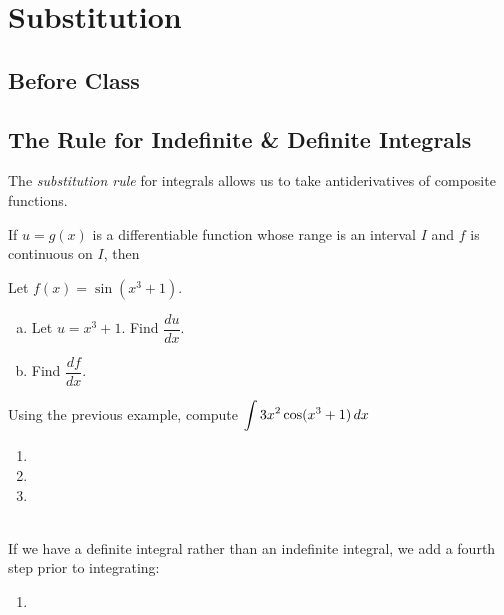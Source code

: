 \documentclass[notes]{subfiles}
\begin{document}
	\setcounter{section}{4}
	\fancyhead[LO,RE]{\bfseries \currentname}
	\fancyfoot[C]{{}}
	\fancyfoot[RO,LE]{\large \thepage}	%
	
\section*{Substitution}\label{cs55}
	\subsection*{Before Class}
	\subsection*{The Rule for Indefinite \& Definite Integrals}
		The \emph{substitution rule} for integrals allows us to take antiderivatives of composite functions.
		\begin{thm}
			If \(u = g(x)\) is a differentiable function whose range is an interval \(I\) and \(f\) is continuous on \(I\), then \vspace{.5in}
		\end{thm}
		 	
		\begin{ex}
		 	  Let \(f(x) = \sin (x^3 + 1)\).  
		 	  \begin{enumerate}[(a)]
		 	  	\item Let \(u = x^3 + 1\).  Find \(\dfrac{du}{dx}\).
		 	  		
		 	  	\item Find \(\dfrac{df}{dx}\).
		 	  		
		 	  \end{enumerate}
		\end{ex}
			
		\begin{ex}
			Using the previous example, compute \(\displaystyle \int 3x^2\cos(x^3+1)\, dx\)
		\end{ex}
			\newpage
		
		\begin{rmk}
			\begin{enumerate}[(1)]
			\setlength\itemsep{30pt}
				\item 
				\item 
				\item 
			\end{enumerate}
			\\ \vspace{.25in}
			If we have a definite integral rather than an indefinite integral, we add a fourth step prior to integrating:\\
			\begin{enumerate}[(4)]
				\item \( \)
			\end{enumerate} \\
		\end{rmk}
			
\end{document}
